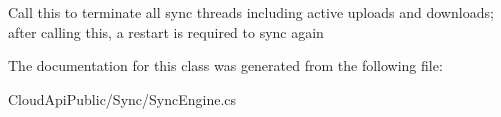 Call this to terminate all sync threads including active uploads and downloads; after calling this, a restart is required to sync again 



The documentation for this class was generated from the following file\-:\begin{DoxyCompactItemize}
\item 
Cloud\-Api\-Public/\-Sync/Sync\-Engine.\-cs\end{DoxyCompactItemize}
